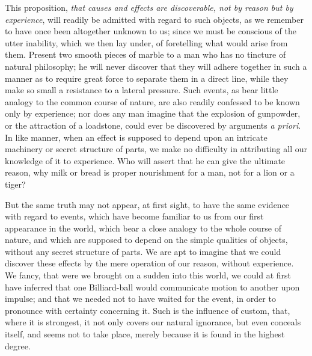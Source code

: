 \documentclass[]{article}
\begin{document}
\begin{sectionbody}
\humeparagraph  This proposition, \emph{that causes and effects are discoverable, not by reason but by experience}, will readily be admitted with regard to such objects, as we remember to have once been altogether unknown to us; since we must be conscious of the utter inability, which we then lay under, of foretelling what would arise from them. Present two smooth pieces of marble to a man who has no tincture of natural philosophy; he will never discover that they will adhere together in such a manner as to require great force to separate them in a direct line, while they make so small a resistance to a lateral pressure. Such events, as bear little analogy to the common course of nature, are also readily confessed to be known only by experience; nor does any man imagine that the explosion of gunpowder, or the attraction of a loadstone, could ever be discovered by arguments \emph{a priori}. In like manner, when an effect is supposed to depend upon an intricate machinery or secret structure of parts, we make no difficulty in attributing all our knowledge of it to experience. Who will assert that he can give the ultimate reason, why milk or bread is proper nourishment for a man, not for a lion or a tiger?

\humeparagraph  But the same truth may not appear, at first sight, to have the same evidence with regard to events, which have become familiar to us from our first appearance in the world, which bear a close analogy to the whole course of nature, and which are supposed to depend on the simple qualities of objects, without any secret structure of parts. We are apt to imagine that we could discover these effects by the mere operation of our reason, without experience. We fancy, that were we brought on a sudden into this world, we could at first have inferred that one Billiard-ball would communicate motion to another upon impulse; and that we needed not to have waited for the event, in order to pronounce with certainty concerning it. Such is the influence of custom, that, where it is strongest, it not only covers our natural ignorance, but even conceals itself, and seems not to take place, merely because it is found in the highest degree.


\end{sectionbody}
\end{document}
